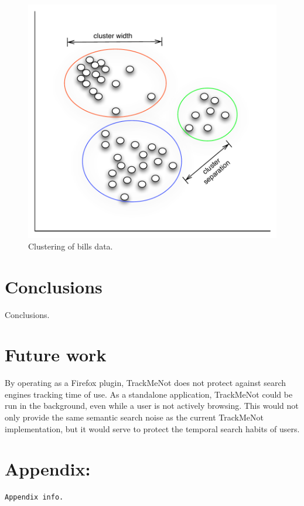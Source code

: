 \documentclass[11pt]{article}
\begin{document}
\begin{multicols}{2}
  \begin{figure}[h]
    \centering
    \includegraphics[width=\columnwidth]{clusterbill1}
    \caption{Clustering of bills data.}
    \label{fig:cluster.bill}
  \end{figure}

\section{Conclusions}
\label{sec:conc}
Conclusions.

\section{Future work}
\label{sec:future}
By operating as a Firefox plugin, TrackMeNot does not protect against search engines tracking time of use. As a standalone application, TrackMeNot could be run in the background, even while a user is not actively browsing. This would not only provide the same semantic search noise as the current TrackMeNot implementation, but it would serve to protect the temporal search habits of users.





\end{multicols}
\newpage
\begin{appendix} \label{appendix}
\section*{Appendix:}
{\tiny
\begin{verbatim}
Appendix info.
\end{verbatim}
}
\end{appendix}
\end{document}
